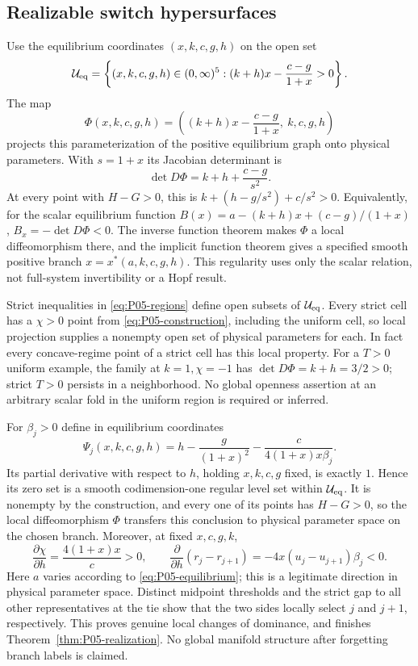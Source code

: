 \subsection{Realizable switch hypersurfaces}

Use the equilibrium coordinates $(x,k,c,g,h)$ on the open set
\begin{equation}
 \mathcal U_{\rm eq}=
 \left\{(x,k,c,g,h)\in(0,\infty)^5:
     (k+h)x-\frac{c-g}{1+x}>0\right\}.
 \label{eq:P05-equilibrium-chart}
\end{equation}
The map
\[
 \Phi(x,k,c,g,h)=\left((k+h)x-\frac{c-g}{1+x},\ k,c,g,h\right)
\]
projects this parameterization of the positive equilibrium graph onto
physical parameters. With $s=1+x$ its Jacobian determinant is
\begin{equation}
 \det D\Phi=k+h+\frac{c-g}{s^2}.
 \label{eq:P05-chart-determinant}
\end{equation}
At every point with $H-G>0$, this is
$k+(h-g/s^2)+c/s^2>0$. Equivalently, for the scalar equilibrium
function $B(x)=a-(k+h)x+(c-g)/(1+x)$,
$B_x=-\det D\Phi<0$. The inverse function theorem makes $\Phi$ a
local diffeomorphism there, and the implicit function theorem gives a
specified smooth positive branch $x=x^*(a,k,c,g,h)$. This regularity
uses only the scalar relation, not full-system invertibility or a Hopf result.

Strict inequalities in \eqref{eq:P05-regions} define open subsets of
$\mathcal U_{\rm eq}$. Every strict cell has a $\chi>0$ point from
\eqref{eq:P05-construction}, including the uniform cell, so local
projection supplies a nonempty open set of physical parameters for each.
In fact every concave-regime point of a strict cell has this local property.
For a $T>0$ uniform example, the family at $k=1,\chi=-1$ has
$\det D\Phi=k+h=3/2>0$; strict $T>0$ persists in a neighborhood.
No global openness assertion at an arbitrary scalar fold in the uniform
region is required or inferred.

For $\beta_j>0$ define in equilibrium coordinates
\begin{equation}
 \Psi_j(x,k,c,g,h)=h-\frac{g}{(1+x)^2}
                  -\frac{c}{4(1+x)x\beta_j}.
 \label{eq:P05-level-set}
\end{equation}
Its partial derivative with respect to $h$, holding $x,k,c,g$ fixed,
is exactly $1$. Hence its zero set is a smooth codimension-one regular
level set within $\mathcal U_{\rm eq}$. It is nonempty by the construction,
and every one of its points has $H-G>0$, so the local diffeomorphism
$\Phi$ transfers this conclusion to physical parameter space on the
chosen branch. Moreover, at fixed $x,c,g,k$,
\[
 \frac{\partial\chi}{\partial h}=\frac{4(1+x)x}{c}>0,
 \qquad
 \frac{\partial}{\partial h}(r_j-r_{j+1})
       =-4x(u_j-u_{j+1})\beta_j<0.
\]
Here $a$ varies according to \eqref{eq:P05-equilibrium}; this is a
legitimate direction in physical parameter space. Distinct midpoint
thresholds and the strict gap to all other representatives at the tie
show that the two sides locally select $j$ and $j+1$, respectively.
This proves genuine local changes of dominance, and finishes
Theorem~\ref{thm:P05-realization}. No global manifold structure after
forgetting branch labels is claimed.

